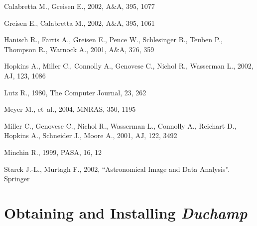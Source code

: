 \documentclass[12pt,a4paper]{article}
\newcommand{\duchamp}{\emph{Duchamp}}
\begin{document}
%
%
%
\begin{thebibliography}{}

{Calabretta} M.,  {Greisen} E.,  2002, A\&A, 395, 1077

{Greisen} E.,  {Calabretta} M.,  2002, A\&A, 395, 1061

{Hanisch} R.,  {Farris} A.,  {Greisen} E.,  {Pence} W.,  {Schlesinger} B.,
  {Teuben} P.,  {Thompson} R.,    {Warnock} A.,  2001, A\&A, 376, 359

{Hopkins} A.,  {Miller} C.,  {Connolly} A.,  {Genovese} C.,  {Nichol} R.,
  {Wasserman} L.,  2002, AJ, 123, 1086

Lutz R.,  1980, The Computer Journal, 23, 262

{Meyer} M.,  et~al., 2004, MNRAS, 350, 1195

{Miller} C.,  {Genovese} C.,  {Nichol} R.,  {Wasserman} L.,  {Connolly} A.,
  {Reichart} D.,  {Hopkins} A.,  {Schneider} J.,    {Moore} A.,  2001, AJ, 122,
  3492

Minchin R.,  1999, PASA, 16, 12

Starck J.-L.,  Murtagh F.,  2002, {``Astronomical Image and Data Analysis''}.
Springer

\end{thebibliography}


\appendix
\newpage
\section{Obtaining and Installing \duchamp}
\end{document}
